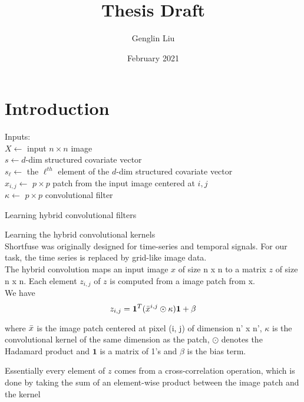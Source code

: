 \documentclass{article}
\title{Thesis Draft}
\author{Genglin Liu }
\date{February 2021}
\begin{document}
\maketitle

\section{Introduction}

\begin{algorithm}[H]
\SetAlgoLined
 Inputs: \\
 $X \leftarrow$ input $n \times n$ image \\
 $s \leftarrow d$-dim structured covariate vector\\
 $s_\ell \leftarrow$ the $\ell^{th}$ element of the $d$-dim structured covariate vector\\
 $x_{i,j} \leftarrow$ $p \times p$ patch from the input image centered at $i,j$ \\
 $\kappa \leftarrow$ $p \times p$ convolutional filter \\ 
 \caption{Learning hybrid convolutional filters}
\end{algorithm}


Learning the hybrid convolutional kernels \\

Shortfuse was originally designed for time-series and temporal signals. For our task, the time series is replaced by grid-like image data.\\

The hybrid convolution maps an input image $x$ of size n x n to a matrix $z$ of size n x n. Each element $z_{i, j}$ of $z$ is computed from a image patch from x. \\

We have $$z_{i, j} = \mathbf{1}^T(\Bar{x}^{i, j} \odot \kappa)\mathbf{1} + \beta$$

where $\Bar{x}$ is the image patch centered at pixel (i, j) of dimension n' x n', $\kappa$ is the convolutional kernel of the same dimension as the patch, $\odot$ denotes the Hadamard product and $\mathbf{1}$ is a matrix of 1's and $\beta$ is the bias term.  

Essentially every element of $z$ comes from a cross-correlation operation, which is done by taking the sum of an element-wise product between the image patch and the kernel
\end{document}
